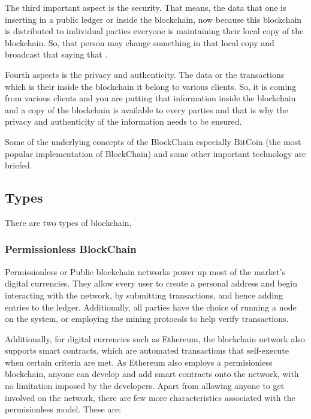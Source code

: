 The third important aspect is the security. That means, the data that one is inserting in a public ledger or inside the blockchain, now because this blockchain is distributed to individual parties everyone is maintaining their local copy of the blockchain. So, that person may change something in that local copy and broadcast that saying that .

Fourth aspects is the privacy and authenticity. The data or the transactions which is their inside the blockchain it belong to various clients. So, it is coming from various clients and you are putting that information inside the blockchain and a copy of the blockchain is available to every parties and that is why the privacy and authenticity of the information needs to be ensured.

Some of the underlying concepts of the BlockChain especially BitCoin (the most popular implementation of BlockChain) and some other important technology are briefed.

\subsection{Types}
There are two types of blockchain,

\subsubsection{Permissionless BlockChain}
Permissionless or Public blockchain networks power up most of the market's digital currencies. They allow every user to create a personal address and begin interacting with the network, by submitting transactions, and hence adding entries to the ledger. Additionally, all parties have the choice of running a node on the system, or employing the mining protocols to help verify transactions.

Additionally, for digital currencies such as Ethereum, the blockchain network also supports smart contracts, which are automated transactions that self-execute when certain criteria are met. As Ethereum also employs a permisionless blockchain, anyone can develop and add smart contracts onto the network, with no limitation imposed by the developers. Apart from allowing anyone to get involved on the network, there are few more characteristics associated with the permisionless model. These are:

